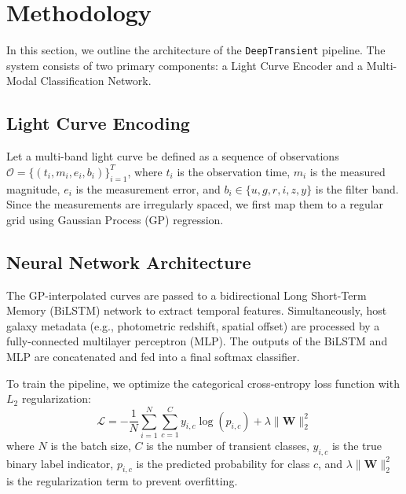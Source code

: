 \section{Methodology}
In this section, we outline the architecture of the \texttt{DeepTransient} pipeline. The system consists of two primary components: a Light Curve Encoder and a Multi-Modal Classification Network.

\subsection{Light Curve Encoding}
Let a multi-band light curve be defined as a sequence of observations $\mathcal{O} = \{(t_i, m_i, e_i, b_i)\}_{i=1}^T$, where $t_i$ is the observation time, $m_i$ is the measured magnitude, $e_i$ is the measurement error, and $b_i \in \{u, g, r, i, z, y\}$ is the filter band. Since the measurements are irregularly spaced, we first map them to a regular grid using Gaussian Process (GP) regression.

\subsection{Neural Network Architecture}
The GP-interpolated curves are passed to a bidirectional Long Short-Term Memory (BiLSTM) network to extract temporal features. Simultaneously, host galaxy metadata (e.g., photometric redshift, spatial offset) are processed by a fully-connected multilayer perceptron (MLP). The outputs of the BiLSTM and MLP are concatenated and fed into a final softmax classifier.

To train the pipeline, we optimize the categorical cross-entropy loss function with $L_2$ regularization:
\begin{equation}
\mathcal{L} = -\frac{1}{N} \sum_{i=1}^{N} \sum_{c=1}^{C} y_{i,c} \log(p_{i,c}) + \lambda \|\mathbf{W}\|^2_2
\label{eq:loss}
\end{equation}
where $N$ is the batch size, $C$ is the number of transient classes, $y_{i,c}$ is the true binary label indicator, $p_{i,c}$ is the predicted probability for class $c$, and $\lambda \|\mathbf{W}\|^2_2$ is the regularization term to prevent overfitting.
